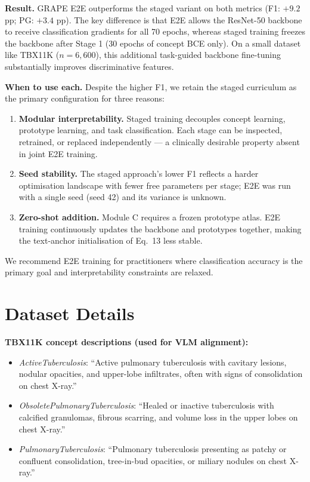 \documentclass{article}
\begin{document}
\noindent\textbf{Result.}
GRAPE E2E outperforms the staged variant on both metrics (F1: $+9.2$ pp; PG: $+3.4$ pp).
The key difference is that E2E allows the ResNet-50 backbone to receive classification gradients for all 70 epochs, whereas staged training freezes the backbone after Stage 1 (30 epochs of concept BCE only).
On a small dataset like TBX11K ($n=6{,}600$), this additional task-guided backbone fine-tuning substantially improves discriminative features.

\noindent\textbf{When to use each.}
Despite the higher F1, we retain the staged curriculum as the primary configuration for three reasons:
\begin{enumerate}
  \item \textbf{Modular interpretability.} Staged training decouples concept learning, prototype learning, and task classification. Each stage can be inspected, retrained, or replaced independently — a clinically desirable property absent in joint E2E training.
  \item \textbf{Seed stability.} The staged approach's lower F1 reflects a harder optimisation landscape with fewer free parameters per stage; E2E was run with a single seed (seed 42) and its variance is unknown.
  \item \textbf{Zero-shot addition.} Module C requires a frozen prototype atlas. E2E training continuously updates the backbone and prototypes together, making the text-anchor initialisation of Eq.~13 less stable.
\end{enumerate}
We recommend E2E training for practitioners where classification accuracy is the primary goal and interpretability constraints are relaxed.

\section{Dataset Details}
\label{app:datasets}

\textbf{TBX11K concept descriptions (used for VLM alignment):}
\begin{itemize}
    \item \textit{ActiveTuberculosis}: ``Active pulmonary tuberculosis with cavitary lesions, nodular opacities, and upper-lobe infiltrates, often with signs of consolidation on chest X-ray.''
    \item \textit{ObsoletePulmonaryTuberculosis}: ``Healed or inactive tuberculosis with calcified granulomas, fibrous scarring, and volume loss in the upper lobes on chest X-ray.''
    \item \textit{PulmonaryTuberculosis}: ``Pulmonary tuberculosis presenting as patchy or confluent consolidation, tree-in-bud opacities, or miliary nodules on chest X-ray.''
\end{itemize}
\end{document}
